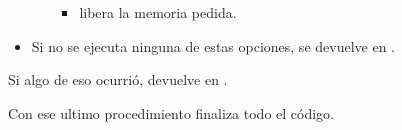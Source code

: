 \begin{itemize}
\begin{itemize}
\begin{itemize}
                    \item {} libera la memoria pedida.

                 \end{itemize}

        \end{itemize}

    \item Si no se ejecuta ninguna de estas opciones, se devuelve 
        en .

\end{itemize}

Si algo de eso ocurrió, devuelve  en .

Con ese ultimo procedimiento finaliza todo el código.
